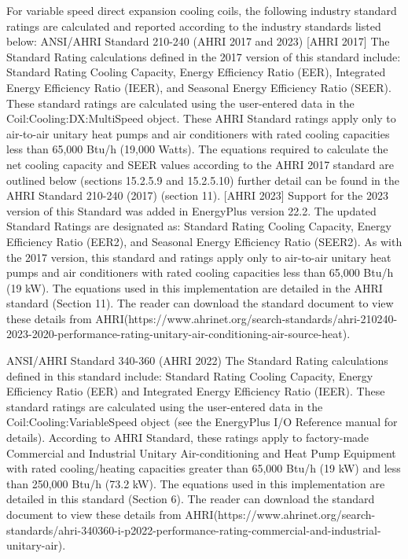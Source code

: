 For variable speed direct expansion cooling coils, the following industry standard ratings are calculated and reported according to the industry standards listed below:
ANSI/AHRI Standard 210-240 (AHRI 2017 and 2023)
[AHRI 2017] The Standard Rating calculations defined in the 2017 version of this standard include: Standard Rating Cooling Capacity, Energy Efficiency Ratio (EER), Integrated Energy Efficiency Ratio (IEER), and Seasonal Energy Efficiency Ratio (SEER). These standard ratings are calculated using the user-entered data in the Coil:Cooling:DX:MultiSpeed object. These AHRI Standard ratings apply only to air-to-air unitary heat pumps and air conditioners with rated cooling capacities less than 65,000 Btu/h (19,000 Watts). The equations required to calculate the net cooling capacity and SEER values according to the AHRI 2017 standard are outlined below (sections 15.2.5.9 and 15.2.5.10) further detail can be found in the AHRI Standard 210-240 (2017) (section 11).
[AHRI 2023] Support for the 2023 version of this Standard was added in EnergyPlus version 22.2. The updated Standard Ratings are designated as: Standard Rating Cooling Capacity, Energy Efficiency Ratio (EER2), and Seasonal Energy Efficiency Ratio (SEER2). As with the 2017 version, this standard and ratings apply only to air-to-air unitary heat pumps and air conditioners with rated cooling capacities less than 65,000 Btu/h (19 kW). The equations used in this implementation are detailed in the AHRI standard (Section 11). The reader can download the standard document to view these details from AHRI(https://www.ahrinet.org/search-standards/ahri-210240-2023-2020-performance-rating-unitary-air-conditioning-air-source-heat).

ANSI/AHRI Standard 340-360 (AHRI 2022)
The Standard Rating calculations defined in this standard include: Standard Rating Cooling Capacity, Energy Efficiency Ratio (EER) and Integrated Energy Efficiency Ratio (IEER). These standard ratings are calculated using the user-entered data in the Coil:Cooling:VariableSpeed object (see the EnergyPlus I/O Reference manual for details). According to AHRI Standard, these ratings apply to factory-made Commercial and Industrial Unitary Air-conditioning and Heat Pump Equipment with rated cooling/heating capacities greater than 65,000 Btu/h (19 kW) and less than 250,000 Btu/h (73.2 kW). The equations used in this implementation are detailed in this standard (Section 6). The reader can download the standard document to view these details from AHRI(https://www.ahrinet.org/search-standards/ahri-340360-i-p2022-performance-rating-commercial-and-industrial-unitary-air).

